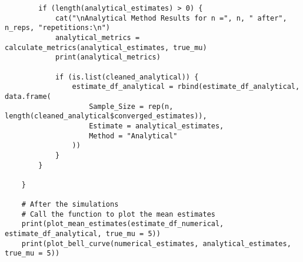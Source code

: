 \begin{verbatim}
        if (length(analytical_estimates) > 0) {
            cat("\nAnalytical Method Results for n =", n, " after", n_reps, "repetitions:\n")
            analytical_metrics = calculate_metrics(analytical_estimates, true_mu)
            print(analytical_metrics)

            if (is.list(cleaned_analytical)) {
                estimate_df_analytical = rbind(estimate_df_analytical, data.frame(
                    Sample_Size = rep(n, length(cleaned_analytical$converged_estimates)),
                    Estimate = analytical_estimates,
                    Method = "Analytical"
                ))
            }
        }

    }

    # After the simulations
    # Call the function to plot the mean estimates
    print(plot_mean_estimates(estimate_df_numerical, estimate_df_analytical, true_mu = 5))
    print(plot_bell_curve(numerical_estimates, analytical_estimates, true_mu = 5))
\end{verbatim}

